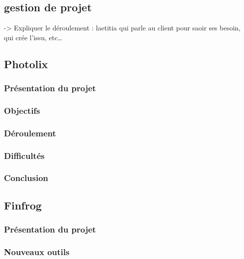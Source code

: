 \documentclass[12pt,a4paper]{article}
\begin{document}
  \subsection{gestion de projet}\label{gestion-de-projet}

  -\textgreater{} Expliquer le déroulement : laetitia qui parle au client
  pour saoir ses besoin, qui crée l'issu, etc\ldots{}

  \subsection{Photolix}\label{photolix}

  \subsubsection{Présentation du projet}\label{pruxe9sentation-du-projet}

  \subsubsection{Objectifs}\label{objectifs}

  \subsubsection{Déroulement}\label{duxe9roulement}

  \subsubsection{Difficultés}\label{difficultuxe9s}

  \subsubsection{Conclusion}\label{conclusion}

  \subsection{Finfrog}\label{finfrog}

  \subsubsection{Présentation du
  projet}\label{pruxe9sentation-du-projet-1}

  \subsubsection{Nouveaux outils}\label{nouveaux-outils}
\end{document}

